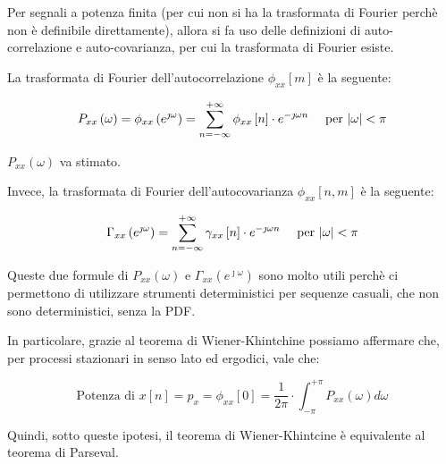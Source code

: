 Per segnali a potenza finita (per cui non si ha la trasformata di Fourier perchè non è definibile direttamente), allora si fa uso delle definizioni di auto-correlazione e auto-covarianza, per cui la trasformata di Fourier esiste. \newline 

La trasformata di Fourier dell'autocorrelazione $\phi_{xx} \left[ m\right]$ è la seguente: 

{
    \Large 
    \begin{equation}
        P_{xx} \left(\omega\right) 
        = 
        \phi_{xx} \left(e^{\jmath \omega}\right)
        = 
        \sum_{n = - \infty}^{+ \infty}
        \phi_{xx} \left[ n\right]
        \cdot 
        e^{- \jmath \omega n}
        \quad 
        \text{ per }
        \abs{\omega} < \pi
    \end{equation}
}

$P_{xx} \left(\omega\right) $ va stimato. \newline 

Invece, la trasformata di Fourier dell'autocovarianza $\phi_{xx} \left[ n, m\right]$ è la seguente: 

{
    \Large 
    \begin{equation}
        \Gamma_{xx} \left(e^{\jmath \omega}\right) 
        = 
        \sum_{n = - \infty}^{+ \infty} 
        \gamma_{xx} \left[ n\right] \cdot e^{- \jmath \omega n}
        \quad 
        \text{ per }
        \abs{\omega} < \pi 
    \end{equation}
}

Queste due formule di $P_{xx} \left(\omega\right)$ e $\Gamma_{xx} \left(e^{\jmath \omega}\right)$ sono molto utili perchè ci permettono di utilizzare strumenti deterministici 
per sequenze casuali, che non sono deterministici, senza la PDF. \newline 

In particolare, grazie al teorema di Wiener-Khintchine possiamo affermare che, per processi stazionari in senso lato ed ergodici, vale che: 

{
    \Large 
    \begin{equation}
        \text{Potenza di } x \left[ n\right] = p_{x} = \phi_{xx} \left[ 0\right] = \dfrac{1}{2 \pi} \cdot \int_{- \pi}^{+ \pi} P_{xx} \left(\omega\right) d\omega
    \end{equation}
}

Quindi, sotto queste ipotesi, il teorema di Wiener-Khintcine è equivalente al teorema di Parseval. \newline 

